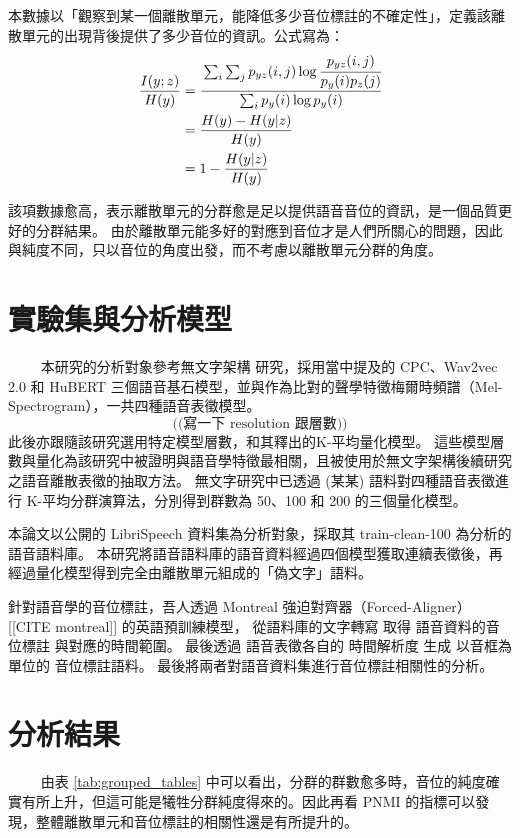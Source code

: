本數據以「觀察到某一個離散單元，能降低多少音位標註的不確定性」，定義該離散單元的出現背後提供了多少音位的資訊。公式寫為：
\begin{align}
\frac{I(y;z)}{H(y)}&=\cfrac{\sum_i \sum_j p_{yz}(i, j) \log \cfrac{p_{yz}(i, j)}{p_y(i)p_z(j)}}{\sum_i p_y(i) \log p_y(i)} \\
&=\frac{H(y)-H(y|z)}{H(y)} \\
&=1-\frac{H(y|z)}{H(y)}
\end{align}

該項數據愈高，表示離散單元的分群愈是足以提供語音音位的資訊，是一個品質更好的分群結果。
由於離散單元能多好的對應到音位才是人們所關心的問題，因此與純度不同，只以音位的角度出發，而不考慮以離散單元分群的角度。



\section{實驗集與分析模型}
　　
本研究的分析對象參考無文字架構 \cite{noauthor_textless_2021, lakhotia_generative_2021, lakhotia_generative_2021-1}  研究，採用當中提及的 CPC、Wav2vec 2.0 和 HuBERT 三個語音基石模型，並與作為比對的聲學特徵梅爾時頻譜（Mel-Spectrogram），一共四種語音表徵模型。
$$
\text{((寫一下 resolution 跟層數))}
$$
此後亦跟隨該研究選用特定模型層數，和其釋出的K-平均量化模型。
這些模型層數與量化為該研究中被證明與語音學特徵最相關，且被使用於無文字架構後續研究之語音離散表徵的抽取方法。
無文字研究中已透過 (某某) 語料對四種語音表徵進行 K-平均分群演算法，分別得到群數為 50、100 和 200 的三個量化模型。

本論文以公開的 LibriSpeech 資料集為分析對象，採取其 train-clean-100 為分析的語音語料庫。
本研究將語音語料庫的語音資料經過四個模型獲取連續表徵後，再經過量化模型得到完全由離散單元組成的「偽文字」語料。

針對語音學的音位標註，吾人透過 Montreal 強迫對齊器（Forced-Aligner） [[CITE montreal]] 的英語預訓練模型， 從語料庫的文字轉寫 取得 語音資料的音位標註 與對應的時間範圍。 最後透過 語音表徵各自的 時間解析度 生成 以音框為單位的 音位標註語料。
最後將兩者對語音資料集進行音位標註相關性的分析。



\section{分析結果}



　　
由表 \ref{tab:grouped_tables} 中可以看出，分群的群數愈多時，音位的純度確實有所上升，但這可能是犧牲分群純度得來的。因此再看 PNMI 的指標可以發現，整體離散單元和音位標註的相關性還是有所提升的。

